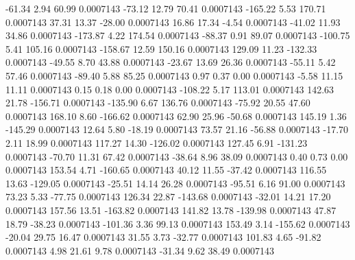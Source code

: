      -61.34        2.94       60.99     0.0007143
      -73.12       12.79       70.41     0.0007143
     -165.22        5.53      170.71     0.0007143
       37.31       13.37      -28.00     0.0007143
       16.86       17.34       -4.54     0.0007143
      -41.02       11.93       34.86     0.0007143
     -173.87        4.22      174.54     0.0007143
      -88.37        0.91       89.07     0.0007143
     -100.75        5.41      105.16     0.0007143
     -158.67       12.59      150.16     0.0007143
      129.09       11.23     -132.33     0.0007143
      -49.55        8.70       43.88     0.0007143
      -23.67       13.69       26.36     0.0007143
      -55.11        5.42       57.46     0.0007143
      -89.40        5.88       85.25     0.0007143
        0.97        0.37        0.00     0.0007143
       -5.58       11.15       11.11     0.0007143
        0.15        0.18        0.00     0.0007143
     -108.22        5.17      113.01     0.0007143
      142.63       21.78     -156.71     0.0007143
     -135.90        6.67      136.76     0.0007143
      -75.92       20.55       47.60     0.0007143
      168.10        8.60     -166.62     0.0007143
       62.90       25.96      -50.68     0.0007143
      145.19        1.36     -145.29     0.0007143
       12.64        5.80      -18.19     0.0007143
       73.57       21.16      -56.88     0.0007143
      -17.70        2.11       18.99     0.0007143
      117.27       14.30     -126.02     0.0007143
      127.45        6.91     -131.23     0.0007143
      -70.70       11.31       67.42     0.0007143
      -38.64        8.96       38.09     0.0007143
        0.40        0.73        0.00     0.0007143
      153.54        4.71     -160.65     0.0007143
       40.12       11.55      -37.42     0.0007143
      116.55       13.63     -129.05     0.0007143
      -25.51       14.14       26.28     0.0007143
      -95.51        6.16       91.00     0.0007143
       73.23        5.33      -77.75     0.0007143
      126.34       22.87     -143.68     0.0007143
      -32.01       14.21       17.20     0.0007143
      157.56       13.51     -163.82     0.0007143
      141.82       13.78     -139.98     0.0007143
       47.87       18.79      -38.23     0.0007143
     -101.36        3.36       99.13     0.0007143
      153.49        3.14     -155.62     0.0007143
      -20.04       29.75       16.47     0.0007143
       31.55        3.73      -32.77     0.0007143
      101.83        4.65      -91.82     0.0007143
        4.98       21.61        9.78     0.0007143
      -31.34        9.62       38.49     0.0007143
